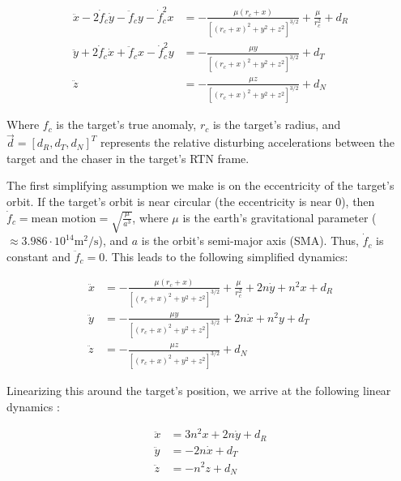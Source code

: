 \documentclass[12pt, letterpaper,titlepage]{article}
\begin{document}
\begin{equation}
    \label{full_dynamics}
    \begin{split}
        \ddot{x} - 2\dot{f}_c\dot{y} - \ddot{f}_c y - \dot{f}_c^2 x & =
            -\frac{\mu(r_c + x)}{\left[ (r_c+x)^2 + y^2 + z^2\right]^{3/2}} +
            \frac{\mu}{r_c^2} + d_R \\
        \ddot{y} + 2\dot{f}_c\dot{x} + \ddot{f}_c x - \dot{f}_c^2 y & =
            -\frac{\mu y}{\left[ (r_c+x)^2 + y^2 + z^2\right]^{3/2}} + d_T \\
        \ddot{z} & = -\frac{\mu z}{\left[ (r_c+x)^2 + y^2 + z^2\right]^{3/2}} +
            d_N
    \end{split}
\end{equation}

Where $f_c$ is the target's true anomaly, $r_c$ is the target's radius, and
$\vec{d} = [d_R, d_T, d_N]^T$ represents the relative disturbing accelerations
between the target and the chaser in the target's RTN frame.

The first simplifying assumption we make is on the eccentricity of the target's
orbit. If the target's orbit is near circular (the eccentricity is near 0),
then $\dot{f}_c = \text{mean motion} = \sqrt{\frac{\mu}{a^3}}$, where $\mu$ is
the earth's gravitational parameter ($\approx 3.986\cdot10^{14} \text{
m}^2/\text{s}$), and $a$ is the orbit's semi-major axis (SMA). Thus,
$\dot{f}_c$ is constant and $\ddot{f}_c = 0$. This leads to the following
simplified dynamics:

\begin{equation}
    \label{circular_dynamics}
    \begin{split}
        \ddot{x} & =
            -\frac{\mu(r_c + x)}{\left[ (r_c+x)^2 + y^2 + z^2\right]^{3/2}} +
            \frac{\mu}{r_c^2} + 2n\dot{y} + n^2 x + d_R \\
        \ddot{y} & = -\frac{\mu y}{\left[ (r_c+x)^2 + y^2 + z^2\right]^{3/2}} +
            2n\dot{x} + n^2 y + d_T \\
        \ddot{z} & = -\frac{\mu z}{\left[ (r_c+x)^2 + y^2 + z^2\right]^{3/2}} +
            d_N
    \end{split}
\end{equation}

Linearizing this around the target's position, we arrive at the
following linear dynamics \cite{cli_clohessy_nodate}:

\begin{equation}
    \label{linear_dynamics}
    \begin{split}
        \ddot{x} & = 3n^2 x + 2n\dot{y}  + d_R \\
        \ddot{y} & = -2n\dot{x} + d_T \\
        \ddot{z} & = -n^2z + d_N
    \end{split}
\end{equation}
\end{document}
